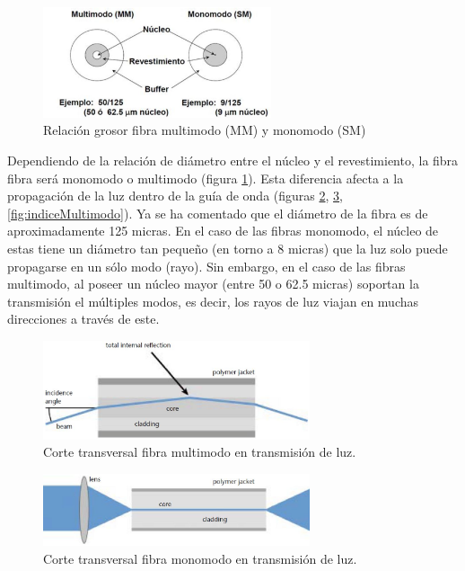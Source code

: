   \begin{figure}[H]
 	\centering
 	\includegraphics[width=0.6\textwidth]{./img/MM-SM}
 	\caption{Relación grosor fibra multimodo (MM) y monomodo (SM) \cite{imgRadioModo} } 
 	\label{fig:modoMonoMulti}
 \end{figure} 
 
  Dependiendo de la relación de diámetro entre el núcleo y el revestimiento, la fibra fibra será monomodo o multimodo (figura \ref{fig:modoMonoMulti}). Esta diferencia afecta a la propagación de la luz dentro de la guía de onda (figuras \ref{fig:guiaMM}, \ref{fig:guiaSM}, \ref{fig:indiceMultimodo}). Ya se ha comentado que el diámetro de la fibra es de aproximadamente 125 micras. En el caso de las fibras monomodo, el núcleo de estas tiene un diámetro tan pequeño (en torno a 8 micras) que la luz solo puede propagarse en un sólo modo (rayo). Sin embargo, en el caso de las fibras multimodo, al poseer un núcleo mayor (entre 50 o 62.5 micras) soportan la transmisión el múltiples modos, es decir, los rayos de luz viajan en muchas direcciones a través de este. \cite{FOA} 
   
   	\begin{figure}[H]
		\centering
		\includegraphics[width=0.7\textwidth]{./img/guiaMM}
		\caption{Corte transversal fibra multimodo en transmisión de luz. \cite{imgMonoMulti} } 
		\label{fig:guiaMM}
	\end{figure} 
  	\begin{figure}[H]
		\centering
		\includegraphics[width=0.7\textwidth]{./img/guiaSM}
		\caption{Corte transversal fibra monomodo en transmisión de luz. \cite{imgMonoMulti} } 
		\label{fig:guiaSM}
	\end{figure}  
 	
